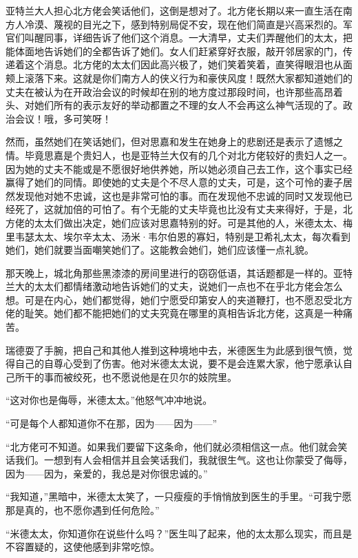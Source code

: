 \par 亚特兰大人担心北方佬会笑话他们，这倒是想对了。北方佬长期以来一直生活在南方人冷漠、蔑视的目光之下，感到特别局促不安，现在他们简直是兴高采烈的。军官们叫醒同事，详细告诉了他们这个消息。一大清早，丈夫们弄醒他们的太太，把能体面地告诉她们的全都告诉了她们。女人们赶紧穿好衣服，敲开邻居家的门，传递着这个消息。北方佬的太太们因此高兴极了，她们笑着笑着，直笑得眼泪也从面颊上滚落下来。这就是你们南方人的侠义行为和豪侠风度！既然大家都知道她们的丈夫在被认为在开政治会议的时候却在别的地方度过那段时间，也许那些高昂着头、对她们所有的表示友好的举动都置之不理的女人不会再这么神气活现的了。政治会议！哦，多可笑呀！
\par 然而，虽然她们在笑话她们，但对思嘉和发生在她身上的悲剧还是表示了遗憾之情。毕竟思嘉是个贵妇人，也是亚特兰大仅有的几个对北方佬较好的贵妇人之一。因为她的丈夫不能或是不愿很好地供养她，所以她必须自己去工作，这个事实已经赢得了她们的同情。即使她的丈夫是个不尽人意的丈夫，可是，这个可怜的妻子居然发现他对她不忠诚，这也是非常可怕的事。而在发现他不忠诚的同时又发现他已经死了，这就加倍的可怕了。有个无能的丈夫毕竟也比没有丈夫来得好，于是，北方佬的太太们做出决定，她们应该对思嘉特别的好。可是其他的人，米德太太、梅里韦瑟太太、埃尔辛太太、汤米·韦尔伯恩的寡妇，特别是卫希礼太太，每次看到她们，她们就要当面嘲笑她们了。这能教会她们，她们应该懂一点礼貌。
\par 那天晚上，城北角那些黑漆漆的房间里进行的窃窃低语，其话题都是一样的。亚特兰大的太太们都情绪激动地告诉她们的丈夫，说她们一点也不在乎北方佬会怎么想。可是在内心，她们都觉得，她们宁愿受印第安人的夹道鞭打，也不愿忍受北方佬的耻笑。她们都不能把她们的丈夫究竟在哪里的真相告诉北方佬，这真是一种痛苦。
\par 瑞德耍了手腕，把自己和其他人推到这种境地中去，米德医生为此感到很气愤，觉得自己的自尊心受到了伤害。他对米德太太说，要不是会连累大家，他宁愿承认自己所干的事而被绞死，也不愿说他是在贝尔的妓院里。
\par “这对你也是侮辱，米德太太。”他怒气冲冲地说。
\par “可是每个人都知道你不在那，因为——因为——”
\par “北方佬可不知道。如果我们要留下这条命，他们就必须相信这一点。他们就会笑话我们。一想到有人会相信并且会笑话我们，我就很生气。这也让你蒙受了侮辱，因为——因为，亲爱的，我总是对你很忠诚的。”
\par “我知道，”黑暗中，米德太太笑了，一只瘦瘦的手悄悄放到医生的手里。“可我宁愿那是真的，也不愿你遇到任何危险。”
\par “米德太太，你知道你在说些什么吗？”医生叫了起来，他的太太那么现实，而且是不容置疑的，这使他感到非常吃惊。
